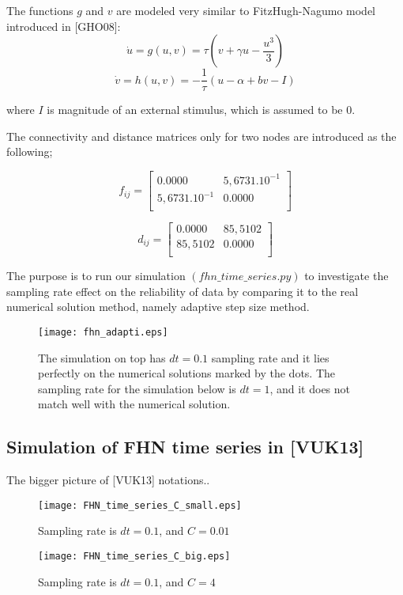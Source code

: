 The functions $g$ and $v$ are modeled very similar to FitzHugh-Nagumo model introduced in [GHO08]:
\begin{equation}
 \dot{u}=g(u,v)=\tau(v+\gamma u - \frac{u^3}{3})
\end{equation}
\begin{equation}
 \dot{v}=h(u,v)=-\frac{1}{\tau}(u- \alpha +bv-I)
\end{equation}

where $I$ is magnitude of an external stimulus, which is assumed to be 0. 

The connectivity and distance matrices only for two nodes are introduced as the following;

\[
\textbf{$f_{ij}$}=
\left[ {\begin{array}{cc }
0.0000  &  5,6731.10^{-1} \\
5,6731.10^{-1} &  0.0000  \\

\end{array} } \right]
\]



\[
\textbf{$d_{ij}$}=
\left[ {\begin{array}{cc }
0.0000  &  85,5102 \\
85,5102 &  0.0000  \\

\end{array} } \right]
\]

The purpose is to run our simulation $(fhn\_time\_series.py)$ to investigate the sampling rate effect on the reliability of data by comparing it to the real numerical solution method, namely adaptive step size method.

\begin{figure}[h!]
	\centering
	\texttt{[image: fhn\_adapti.eps]}
		\caption{The simulation on top has $dt=0.1$ sampling rate and it lies perfectly on the numerical solutions marked by the dots. The sampling rate for the simulation below is $dt=1$, and it does not match well with the numerical solution.}
\end{figure}

\subsection{Simulation of FHN time series in [VUK13]}

The bigger picture of [VUK13] notations..

\begin{figure}[h!]
	\centering
	\texttt{[image: FHN\_time\_series\_C\_small.eps]}
		\caption{Sampling rate is $dt=0.1$, and $C=0.01$}
\end{figure}

\begin{figure}[h!]
	\centering
	\texttt{[image: FHN\_time\_series\_C\_big.eps]}
		\caption{Sampling rate is $dt=0.1$, and $C=4$}
\end{figure}